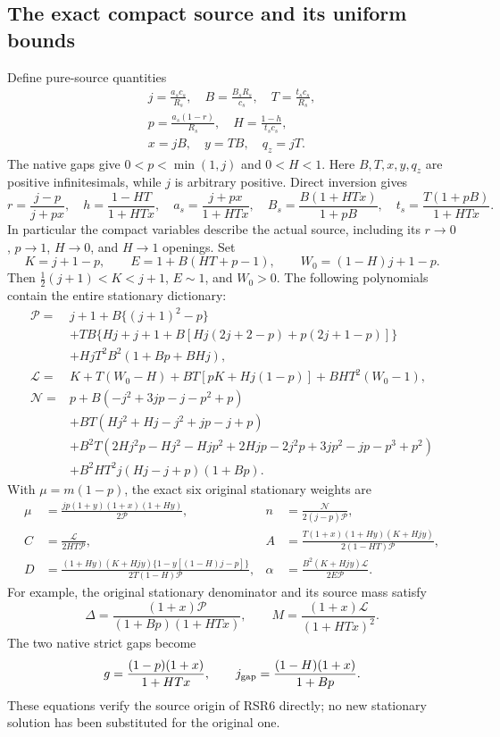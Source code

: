 \subsection{The exact compact source and its uniform bounds}

Define pure-source quantities
\[
\begin{gathered}
 j=\frac{a_sc_s}{R_s},\quad B=\frac{B_sR_s}{c_s},\quad
 T=\frac{t_sc_s}{R_s},\\
 p=\frac{a_s(1-r)}{R_s},\quad H=\frac{1-h}{t_sc_s},\\
 x=jB,\quad y=TB,\quad q_z=jT .
\end{gathered}
 \tag{RSR2}
\]
The native gaps give $0<p<\min(1,j)$ and $0<H<1$.
Here $B,T,x,y,q_z$ are positive infinitesimals, while $j$ is arbitrary
positive. Direct inversion gives
\[
 r=\frac{j-p}{j+px},\quad h=\frac{1-HT}{1+HTx},\quad
 a_s=\frac{j+px}{1+HTx},\quad
 B_s=\frac{B(1+HTx)}{1+pB},\quad
 t_s=\frac{T(1+pB)}{1+HTx}.
 \tag{RSR3}
\]
In particular the compact variables describe the actual source,
including its $r\to0$, $p\to1$, $H\to0$, and $H\to1$ openings.
Set
\[
 K=j+1-p,\qquad E=1+B(HT+p-1),\qquad
 W_0=(1-H)j+1-p.
 \tag{RSR4}
\]
Then $\tfrac12(j+1)<K<j+1$, $E\sim1$, and $W_0>0$.
The following polynomials contain the entire stationary dictionary:
\begin{align*}
\mathcal P={}&j+1+B\{(j+1)^2-p\}\\
 &+TB\{Hj+j+1+B[Hj(2j+2-p)+p(2j+1-p)]\}\\
 &+HjT^2B^2(1+Bp+BHj),\\
\mathcal L={}&K+T(W_0-H)+BT[pK+Hj(1-p)]+BHT^2(W_0-1),\\
\mathcal N={}&p+B(-j^2+3jp-j-p^2+p)\\
 &+BT(Hj^2+Hj-j^2+jp-j+p)\\
 &+B^2T(2Hj^2p-Hj^2-Hjp^2+2Hjp
             -2j^2p+3jp^2-jp-p^3+p^2)\\
 &+B^2HT^2j(Hj-j+p)(1+Bp).
 \tag{RSR5}
\end{align*}
With $\mu=m(1-p)$, the exact six original stationary weights are
\[
\begin{aligned}
 \mu&=\frac{jp(1+y)(1+x)(1+Hy)}{2\mathcal P},&
 n&=\frac{\mathcal N}{2(j-p)\mathcal P},\\
 C&=\frac{\mathcal L}{2HT\mathcal P},&
 A&=\frac{T(1+x)(1+Hy)(K+Hjy)}{2(1-HT)\mathcal P},\\
 D&=\frac{(1+Hy)(K+Hjy)\{1-y[(1-H)j-p]\}}
             {2T(1-H)\mathcal P},&
 \alpha&=\frac{B^2(K+Hjy)\mathcal L}{2E\mathcal P}.
\end{aligned}
 \tag{RSR6}
\]
For example, the original stationary denominator and its source mass
satisfy
\[
 \Delta=\frac{(1+x)\mathcal P}{(1+Bp)(1+HTx)},\qquad
 M=\frac{(1+x)\mathcal L}{(1+HTx)^2}.
\]
The two native strict gaps become
\[
 g=\frac{(1-p)(1+x)}{1+HTx},\qquad
 j_{\rm gap}=\frac{(1-H)(1+x)}{1+Bp}.
\]
These equations verify the source origin of RSR6 directly; no new
stationary solution has been substituted for the original one.

